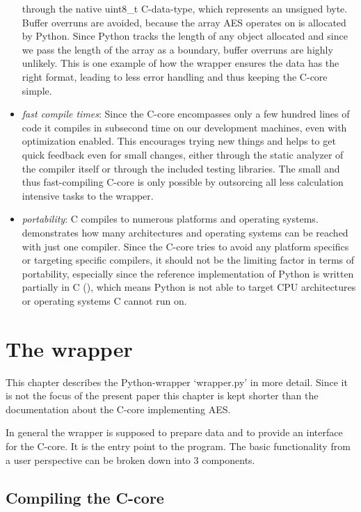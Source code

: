 \begin{itemize}
  through the native uint8\_t C-data-type, which represents an unsigned
  byte. Buffer overruns are avoided, because the array AES operates on
  is allocated by Python. Since Python tracks the length of any object
  allocated and since we pass the length of the array as a boundary,
  buffer overruns are highly unlikely. This is one example of how the
  wrapper ensures the data has the right format, leading to less error
  handling and thus keeping the C-core simple.
\item
  \emph{fast compile times}: Since the C-core encompasses only a few
  hundred lines of code it compiles in subsecond time on our development
  machines, even with optimization enabled. This encourages trying new
  things and helps to get quick feedback even for small changes, either
  through the static analyzer of the compiler itself or through the
  included testing libraries. The small and thus fast-compiling C-core
  is only possible by outsorcing all less calculation intensive tasks to
  the wrapper.
\item
  \emph{portability}: C compiles to numerous platforms and operating
  systems. \cite{gccsys} demonstrates how
  many architectures and operating systems can be reached with just one
  compiler. Since the C-core tries to avoid any platform specifics or
  targeting specific compilers, it should not be the limiting factor in
  terms of portability, especially since the reference implementation of
  Python is written partially in C (\cite{pyref}),
  which means Python is not able to target CPU architectures or
  operating systems C cannot run on.
\end{itemize}


\hypertarget{the-wrapper}{%
\section{The wrapper}\label{the-wrapper}}

This chapter describes the Python-wrapper `wrapper.py' in more detail.
Since it is not the focus of the present paper this chapter is kept
shorter than the documentation about the C-core implementing AES.

In general the wrapper is supposed to prepare data and to provide an
interface for the C-core. It is the entry point to the program. The
basic functionality from a user perspective can be broken down into 3
components.

\hypertarget{compiling-the-c-core}{%
\subsection{Compiling the C-core}\label{compiling-the-c-core}}

